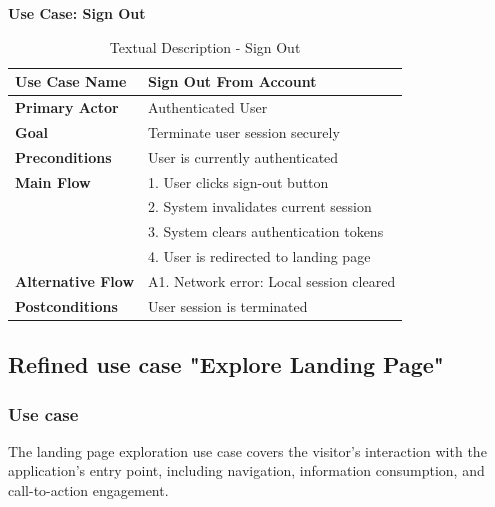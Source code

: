 \textbf{Use Case: Sign Out}
\begin{table}[H]
\centering
\caption{Textual Description - Sign Out}
\label{tab:signout_description}
\begin{tabular}{|p{3cm}|p{10cm}|}
\hline
\textbf{Use Case Name} & Sign Out From Account \\
\hline
\textbf{Primary Actor} & Authenticated User \\
\hline
\textbf{Goal} & Terminate user session securely \\
\hline
\textbf{Preconditions} & User is currently authenticated \\
\hline
\textbf{Main Flow} & 
1. User clicks sign-out button \\
& 2. System invalidates current session \\
& 3. System clears authentication tokens \\
& 4. User is redirected to landing page \\
\hline
\textbf{Alternative Flow} & 
A1. Network error: Local session cleared \\
\hline
\textbf{Postconditions} & User session is terminated \\
\hline
\end{tabular}
\end{table}

\subsection{Refined use case "Explore Landing Page"}
\subsubsection{Use case}
The landing page exploration use case covers the visitor's interaction with the application's entry point, including navigation, information consumption, and call-to-action engagement.

